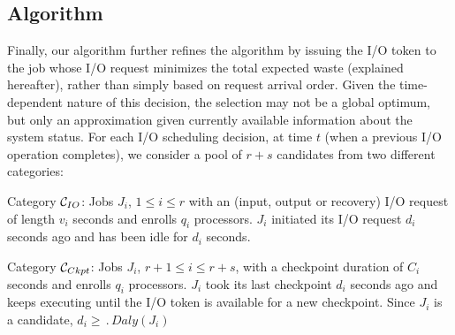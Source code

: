 

\subsection{\leastwaste Algorithm}
\label{sec:least-waste}

Finally, our \leastwaste algorithm further refines the \fifononblock algorithm by
issuing the I/O token to the job whose I/O request minimizes the total expected waste
(explained hereafter), rather than simply based on request arrival order.  Given the
time-dependent nature of this decision, the selection may not be a global optimum,
but only an approximation given currently available information about the system
status.  For each I/O scheduling decision, at time $t$ (when a previous I/O operation
completes), we consider a pool of $r+s$ candidates from two different categories:

\begin{compactitem}
\item Category \IOcat $\mathcal{C}_{IO}$: Jobs $J_{i}$, $1\leq i \leq r$ with an
  (input, output or recovery) I/O request of length $v_{i}$ seconds and enrolls $q_{i}$
  processors. $J_{i}$ initiated its I/O request $d_{i}$ seconds ago and has been idle
  for $d_{i}$ seconds.

\item Category \Ckptcat $\mathcal{C}_{Ckpt}$: Jobs $J_{i}$, $r+1\leq i \leq r+s$,
  with a checkpoint duration of $C_{i}$ seconds and enrolls $q_{i}$ processors.
  $J_{i}$ took its last checkpoint $d_{i}$ seconds ago and keeps executing until the
  I/O token is available for a new checkpoint. Since $J_{i}$ is a candidate,
  $d_{i} \geq \period{Daly}(J_{i})$
\end{compactitem}


